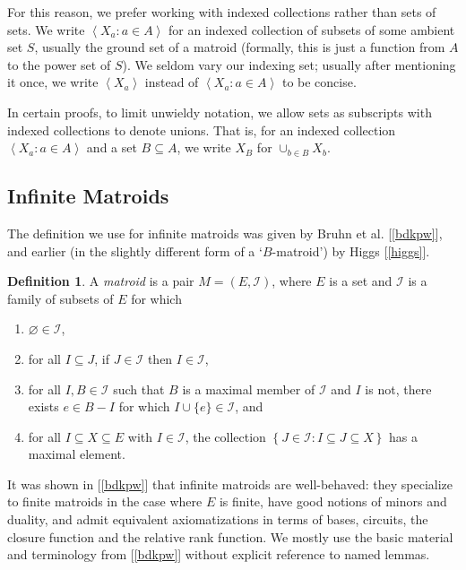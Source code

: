 \documentclass{amsart}
\theoremstyle{plain}
\newcounter{defn}
\theoremstyle{definition}
\newtheorem{definition}[defn]{Definition}
\newcommand{\cI}{\mathcal{I}}
\newcommand{\set}[1]{\left\{#1\right\}}
\newcommand{\ab}[1]{\left\langle#1\right\rangle}
\renewcommand{\ss}{\subseteq}
\newcommand{\setof}[2]{\set{{#1} : {#2}}}
\begin{document}
For this reason, we prefer working with indexed collections rather than 
sets of sets. We write $\ab{X_a : a \in A}$ for an indexed collection of 
subsets of some ambient set $S$, usually the ground set of a matroid
(formally, this is just a function from $A$ to 
the power set of $S$). We seldom vary our indexing set; usually after 
mentioning it once, we write $\ab{X_a}$ instead of $\ab{X_a : a \in A}$ 
to be concise. 

In certain proofs, to limit unwieldy notation, we allow sets as subscripts 
with indexed collections to denote unions. That is, for an indexed 
collection $\ab{X_a : a \in A}$ and a set $B \ss A$, we write $X_B$ for $\cup_{b \in B}X_b$. 

\subsection*{Infinite Matroids}

The definition we use for infinite matroids was given by Bruhn et al. [\ref{bdkpw}],
and earlier (in the slightly different form of a `$B$-matroid') by Higgs [\ref{higgs}].

\begin{definition}
  A \emph{matroid} is a pair $M = (E, \cI)$, where $E$ is a set and $\cI$ is a
  family of subsets of $E$ for which
  \begin{enumerate}[(1)]
    \item\label{I1} $\varnothing \in \cI$,
    \item\label{I2} for all $I \subseteq J$, if $J \in \cI$ then $I \in \cI$, 
    \item\label{I3} for all $I, B \in \cI$ such that $B$ is a maximal member of
      $\cI$ and $I$ is not, there exists $e \in B - I$ for which $I \cup \{e\} \in \cI$, and
    \item\label{IM} for all $I \subseteq X \subseteq E$ with $I \in \cI$, the collection
      $\setof{J \in \cI}{I \subseteq J \subseteq X}$ has a maximal element.
  \end{enumerate}
\end{definition}

It was shown in [\ref{bdkpw}] that infinite matroids are well-behaved: 
they specialize to finite matroids in the case where $E$ is finite, 
have good notions of minors and duality, and admit equivalent axiomatizations 
in terms of bases, circuits, the closure function and the relative rank function. 
We mostly use the basic material and terminology from [\ref{bdkpw}] without explicit reference
to named lemmas. 
\end{document}
